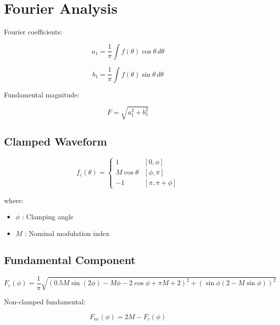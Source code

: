 \documentclass[11pt]{article}
\begin{document}
\section{Fourier Analysis}

Fourier coefficients:

\begin{equation}
a_1 =
\frac{1}{\pi}
\int f(\theta)\cos\theta\, d\theta
\end{equation}

\begin{equation}
b_1 =
\frac{1}{\pi}
\int f(\theta)\sin\theta\, d\theta
\end{equation}

Fundamental magnitude:

\begin{equation}
F = \sqrt{a_1^2 + b_1^2}
\end{equation}

\subsection{Clamped Waveform}

\begin{equation}
f_c(\theta) =
\begin{cases}
1 & [0,\phi] \\
M\cos\theta & [\phi,\pi] \\
-1 & [\pi,\pi+\phi]
\end{cases}
\end{equation}

where:

\begin{itemize}
\item $\phi$ : Clamping angle
\item $M$ : Nominal modulation index
\end{itemize}

\subsection{Fundamental Component}

\begin{equation}
F_c(\phi) =
\frac{1}{\pi}
\sqrt{
\left(0.5M\sin(2\phi) - M\phi - 2\cos\phi + \pi M + 2\right)^2
+
\left(\sin\phi(2 - M\sin\phi)\right)^2
}
\end{equation}

Non-clamped fundamental:

\begin{equation}
F_{nc}(\phi) = 2M - F_c(\phi)
\end{equation}
\end{document}
